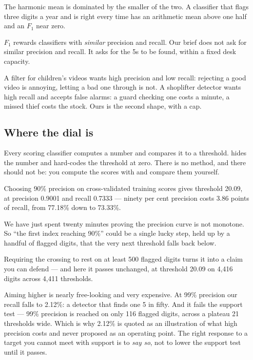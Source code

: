 \documentclass[11pt,a4paper]{article}
\begin{document}
The harmonic mean is dominated by the smaller of the two. A classifier that
flags three digits a year and is right every time has an arithmetic mean above
one half and an $F_1$ near zero.

\begin{keybox}[title={But that is a choice, not a virtue}]
$F_1$ rewards classifiers with \emph{similar} precision and recall. Our brief
does not ask for similar precision and recall. It asks for the 5s to be found,
within a fixed desk capacity.

A filter for children's videos wants high precision and low recall: rejecting a
good video is annoying, letting a bad one through is not. A shoplifter detector
wants high recall and accepts false alarms: a guard checking one costs a
minute, a missed thief costs the stock. Ours is the second shape, with a cap.
\end{keybox}

\subsection{Where the dial is}

Every scoring classifier computes a number and compares it to a threshold.
 hides the number and hard-codes the threshold at zero. There
is no  method, and there should not be: you compute the
scores with  and compare them yourself.

Choosing 90\% precision on cross-validated training scores gives threshold
20.09, at precision 0.9001 and recall 0.7333 --- ninety per cent precision
costs 3.86 points of recall, from 77.18\% down to 73.33\%.

\begin{failbox}[title={Failure condition --- why the crossing needs a support test}]
We have just spent twenty minutes proving the precision curve is not monotone.
So ``the first index reaching 90\%'' could be a single lucky step, held up by a
handful of flagged digits, that the very next threshold falls back below.

Requiring the crossing to rest on at least 500 flagged digits turns it into a
claim you can defend --- and here it passes unchanged, at threshold 20.09 on
4{,}416 digits across 4{,}411 thresholds.

Aiming higher is nearly free-looking and very expensive. At 99\% precision our
recall falls to 2.12\%: a detector that finds one 5 in fifty. And it fails the
support test --- 99\% precision is reached on only 116 flagged digits, across a
plateau 21 thresholds wide. Which is why 2.12\% is quoted as an illustration of
what high precision costs and never proposed as an operating point. The right
response to a target you cannot meet with support is to \emph{say so}, not to
lower the support test until it passes.
\end{failbox}
\end{document}

